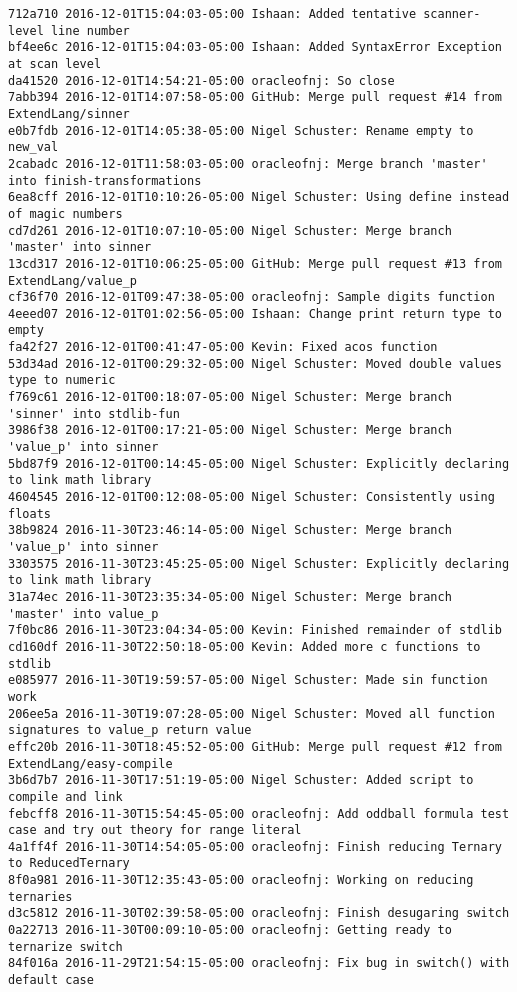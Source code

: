 \begin{lstlisting}
712a710 2016-12-01T15:04:03-05:00 Ishaan: Added tentative scanner-level line number
bf4ee6c 2016-12-01T15:04:03-05:00 Ishaan: Added SyntaxError Exception at scan level
da41520 2016-12-01T14:54:21-05:00 oracleofnj: So close
7abb394 2016-12-01T14:07:58-05:00 GitHub: Merge pull request #14 from ExtendLang/sinner
e0b7fdb 2016-12-01T14:05:38-05:00 Nigel Schuster: Rename empty to new_val
2cabadc 2016-12-01T11:58:03-05:00 oracleofnj: Merge branch 'master' into finish-transformations
6ea8cff 2016-12-01T10:10:26-05:00 Nigel Schuster: Using define instead of magic numbers
cd7d261 2016-12-01T10:07:10-05:00 Nigel Schuster: Merge branch 'master' into sinner
13cd317 2016-12-01T10:06:25-05:00 GitHub: Merge pull request #13 from ExtendLang/value_p
cf36f70 2016-12-01T09:47:38-05:00 oracleofnj: Sample digits function
4eeed07 2016-12-01T01:02:56-05:00 Ishaan: Change print return type to empty
fa42f27 2016-12-01T00:41:47-05:00 Kevin: Fixed acos function
53d34ad 2016-12-01T00:29:32-05:00 Nigel Schuster: Moved double values type to numeric
f769c61 2016-12-01T00:18:07-05:00 Nigel Schuster: Merge branch 'sinner' into stdlib-fun
3986f38 2016-12-01T00:17:21-05:00 Nigel Schuster: Merge branch 'value_p' into sinner
5bd87f9 2016-12-01T00:14:45-05:00 Nigel Schuster: Explicitly declaring to link math library
4604545 2016-12-01T00:12:08-05:00 Nigel Schuster: Consistently using floats
38b9824 2016-11-30T23:46:14-05:00 Nigel Schuster: Merge branch 'value_p' into sinner
3303575 2016-11-30T23:45:25-05:00 Nigel Schuster: Explicitly declaring to link math library
31a74ec 2016-11-30T23:35:34-05:00 Nigel Schuster: Merge branch 'master' into value_p
7f0bc86 2016-11-30T23:04:34-05:00 Kevin: Finished remainder of stdlib
cd160df 2016-11-30T22:50:18-05:00 Kevin: Added more c functions to stdlib
e085977 2016-11-30T19:59:57-05:00 Nigel Schuster: Made sin function work
206ee5a 2016-11-30T19:07:28-05:00 Nigel Schuster: Moved all function signatures to value_p return value
effc20b 2016-11-30T18:45:52-05:00 GitHub: Merge pull request #12 from ExtendLang/easy-compile
3b6d7b7 2016-11-30T17:51:19-05:00 Nigel Schuster: Added script to compile and link
febcff8 2016-11-30T15:54:45-05:00 oracleofnj: Add oddball formula test case and try out theory for range literal
4a1ff4f 2016-11-30T14:54:05-05:00 oracleofnj: Finish reducing Ternary to ReducedTernary
8f0a981 2016-11-30T12:35:43-05:00 oracleofnj: Working on reducing ternaries
d3c5812 2016-11-30T02:39:58-05:00 oracleofnj: Finish desugaring switch
0a22713 2016-11-30T00:09:10-05:00 oracleofnj: Getting ready to ternarize switch
84f016a 2016-11-29T21:54:15-05:00 oracleofnj: Fix bug in switch() with default case

\end{lstlisting}
